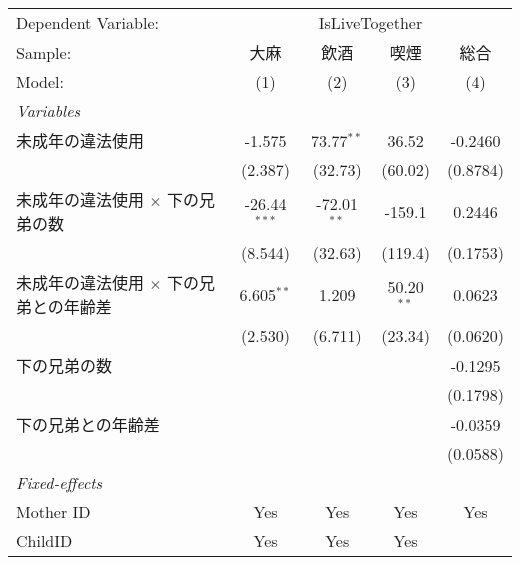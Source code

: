 \documentclass{article}
\begin{document}
\begingroup
\centering
\begin{threeparttable}[b]
   \begin{tabular}{lcccc}
      \tabularnewline \midrule \midrule
      Dependent Variable: & \multicolumn{4}{c}{IsLiveTogether}\\
      Sample:                                       & 大麻           & 飲酒          & 喫煙         & 総合 \\   
      Model:                                        & (1)            & (2)           & (3)          & (4)\\  
      \midrule
      \emph{Variables}\\
      未成年の違法使用                              & -1.575         & 73.77$^{**}$  & 36.52        & -0.2460\\   
                                                    & (2.387)        & (32.73)       & (60.02)      & (0.8784)\\   
      未成年の違法使用 $\times$ 下の兄弟の数        & -26.44$^{***}$ & -72.01$^{**}$ & -159.1       & 0.2446\\   
                                                    & (8.544)        & (32.63)       & (119.4)      & (0.1753)\\   
      未成年の違法使用 $\times$ 下の兄弟との年齢差  & 6.605$^{**}$   & 1.209         & 50.20$^{**}$ & 0.0623\\   
                                                    & (2.530)        & (6.711)       & (23.34)      & (0.0620)\\   
      下の兄弟の数                                  &                &               &              & -0.1295\\   
                                                    &                &               &              & (0.1798)\\   
      下の兄弟との年齢差                            &                &               &              & -0.0359\\   
                                                    &                &               &              & (0.0588)\\   
      \midrule
      \emph{Fixed-effects}\\
      Mother ID                                     & Yes            & Yes           & Yes          & Yes\\  
      ChildID                                       & Yes            & Yes           & Yes          & \\  

\end{tabular}
\end{threeparttable}
\end{document}
